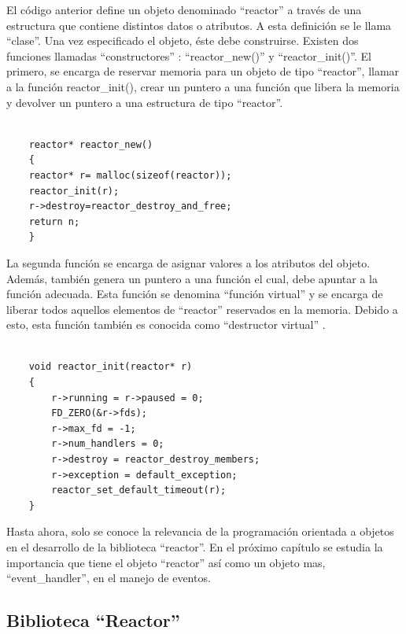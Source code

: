 El código anterior define un objeto denominado ``reactor'' a través de una estructura que contiene distintos datos o atributos. A esta definición se le llama ``clase''. Una vez especificado el objeto, éste debe construirse. Existen dos funciones llamadas ``constructores'' \citep[pág. 93--95]{tallerRPi}: ``reactor\_new()'' y ``reactor\_init()''. El primero, se encarga de reservar memoria para un objeto de tipo ``reactor'', llamar a la función reactor\_init(), crear un puntero a una función que libera la memoria y devolver un puntero a una estructura de tipo ``reactor''. \\

    \begin{verbatim}
    
    reactor* reactor_new()
    {
    reactor* r= malloc(sizeof(reactor));
    reactor_init(r);
    r->destroy=reactor_destroy_and_free;
    return n;
    }
    \end{verbatim}

La segunda función se encarga de asignar valores a los atributos del objeto. Además, también genera un puntero a una función el cual, debe apuntar a la función adecuada. Esta función se denomina ``función virtual'' y se encarga de liberar todos aquellos elementos de ``reactor'' reservados en la memoria. Debido a esto, esta función también es conocida como ``destructor virtual'' \citep[pág. 93--95]{tallerRPi}.\\
    

    \begin{verbatim}
    
    void reactor_init(reactor* r)
    {
        r->running = r->paused = 0;
        FD_ZERO(&r->fds);
        r->max_fd = -1;
        r->num_handlers = 0;
        r->destroy = reactor_destroy_members;
        r->exception = default_exception;
        reactor_set_default_timeout(r);
    }
    \end{verbatim}
    
Hasta ahora, solo se conoce la relevancia de la programación orientada a objetos en el desarrollo de la biblioteca ``reactor''. En el próximo capítulo se estudia la importancia que tiene el objeto ``reactor'' así como un objeto mas, ``event\_handler'', en el manejo de eventos.
    
\subsection{Biblioteca ``Reactor''}\label{s2_1_6}

